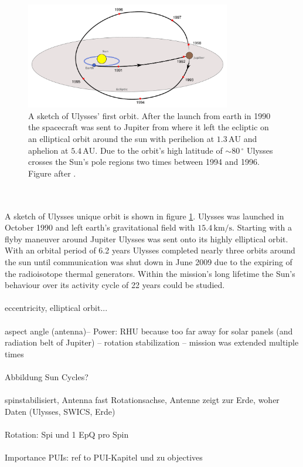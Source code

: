 \begin{figure}[h]
	\includegraphics[width=0.8\textwidth]{Figures/ulysses_trajectory.pdf}
	\centering
	\caption{A sketch of Ulysses' first orbit. After the launch from earth in 1990 the spacecraft was sent to Jupiter from where it left the ecliptic on an elliptical orbit around the sun with perihelion at $1.3\,\mathrm{AU}$ and aphelion at $5.4\,\mathrm{AU}$. Due to the orbit's high latitude of $\sim 80 \, ^\circ$ Ulysses crosses the Sun's pole regions two times between 1994 and 1996. Figure after \citet{esa_orbit}.}
	\label{fig:trajectory}
\end{figure}
\\ \\
A sketch of Ulysses unique orbit is shown in figure \ref{fig:trajectory}.
Ulysses was launched in October 1990 and left earth's gravitational field with $15.4\,\mathrm{km/s}$. Starting with a flyby maneuver around Jupiter Ulysses was sent onto its highly elliptical orbit.
With an orbital period of 6.2 years Ulysses completed nearly three orbits around the sun until communication was shut down in June 2009 due to the expiring of the radioisotope thermal generators.
Within the mission's long lifetime the Sun's behaviour over its activity cycle of 22 years could be studied. 
\\ \\
eccentricity, elliptical orbit...
\\ \\
aspect angle (antenna)-- Power: RHU because too far away for solar panels (and radiation belt of Jupiter) -- rotation stabilization --  mission was extended multiple times
\\ \\
Abbildung Sun Cycles?
\\ \\ 
spinstabilisiert, Antenna fast Rotationsachse, Antenne zeigt zur Erde, woher Daten (Ulysses, SWICS, Erde)
\\ \\
Rotation: Spi und 1 EpQ pro Spin
\\ \\ 
Importance PUIs: ref to PUI-Kapitel und zu objectives
%
%
%
%
%
